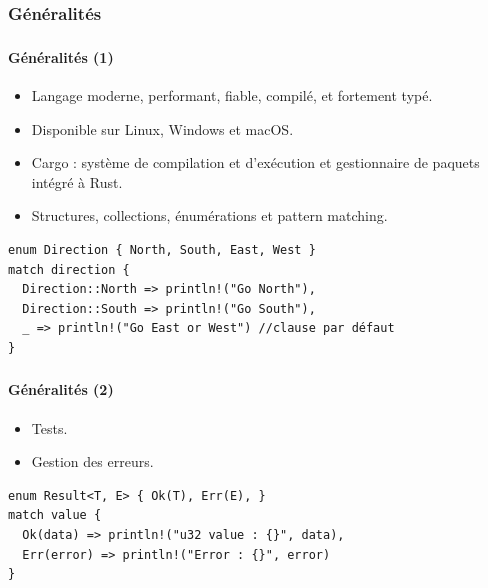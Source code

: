 \documentclass[10pt]{beamer}
\begin{document}
\subsubsection{Généralités}
\begin{frame}[fragile]
    \frametitle{\subsecname}
    \framesubtitle{Généralités (1)}
    \begin{itemize}
        \item Langage moderne, performant, fiable, compilé, et fortement typé.
        \item Disponible sur Linux, Windows et macOS.
        \item Cargo : système de compilation et d'exécution et gestionnaire de paquets intégré à Rust.
        \item Structures, collections, énumérations et pattern matching. 
    \end{itemize}

    \begin{verbatim}
enum Direction { North, South, East, West }
match direction {
  Direction::North => println!("Go North"),
  Direction::South => println!("Go South"),
  _ => println!("Go East or West") //clause par défaut
}
    \end{verbatim}
\end{frame}

\begin{frame}[fragile]
    \frametitle{\subsecname}
    \framesubtitle{Généralités (2)}
    \begin{itemize}
        \item Tests.
        \item Gestion des erreurs.
    \end{itemize}
    \begin{verbatim}
enum Result<T, E> { Ok(T), Err(E), }
match value {
  Ok(data) => println!("u32 value : {}", data),
  Err(error) => println!("Error : {}", error)
}
    \end{verbatim}
\end{frame}
\end{document}
